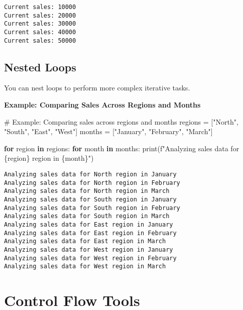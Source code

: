 \documentclass[
  letterpaper,
  DIV=11,
  numbers=noendperiod]{scrreprt}
\newenvironment{Shaded}{\begin{snugshade}}{\end{snugshade}}
\newcommand{\BuiltInTok}[1]{\textcolor[rgb]{0.00,0.23,0.31}{#1}}
\newcommand{\CommentTok}[1]{\textcolor[rgb]{0.37,0.37,0.37}{#1}}
\newcommand{\ControlFlowTok}[1]{\textcolor[rgb]{0.00,0.23,0.31}{\textbf{#1}}}
\newcommand{\KeywordTok}[1]{\textcolor[rgb]{0.00,0.23,0.31}{\textbf{#1}}}
\newcommand{\NormalTok}[1]{\textcolor[rgb]{0.00,0.23,0.31}{#1}}
\newcommand{\OperatorTok}[1]{\textcolor[rgb]{0.37,0.37,0.37}{#1}}
\newcommand{\SpecialCharTok}[1]{\textcolor[rgb]{0.37,0.37,0.37}{#1}}
\newcommand{\SpecialStringTok}[1]{\textcolor[rgb]{0.13,0.47,0.30}{#1}}
\newcommand{\StringTok}[1]{\textcolor[rgb]{0.13,0.47,0.30}{#1}}
\begin{document}
\begin{verbatim}
Current sales: 10000
Current sales: 20000
Current sales: 30000
Current sales: 40000
Current sales: 50000
\end{verbatim}

\subsection{Nested Loops}\label{nested-loops}

You can nest loops to perform more complex iterative tasks.

\textbf{Example: Comparing Sales Across Regions and Months}

\begin{Shaded}
\begin{Highlighting}[]
\CommentTok{\# Example: Comparing sales across regions and months}
\NormalTok{regions }\OperatorTok{=}\NormalTok{ [}\StringTok{"North"}\NormalTok{, }\StringTok{"South"}\NormalTok{, }\StringTok{"East"}\NormalTok{, }\StringTok{"West"}\NormalTok{]}
\NormalTok{months }\OperatorTok{=}\NormalTok{ [}\StringTok{"January"}\NormalTok{, }\StringTok{"February"}\NormalTok{, }\StringTok{"March"}\NormalTok{]}

\ControlFlowTok{for}\NormalTok{ region }\KeywordTok{in}\NormalTok{ regions:}
    \ControlFlowTok{for}\NormalTok{ month }\KeywordTok{in}\NormalTok{ months:}
        \BuiltInTok{print}\NormalTok{(}\SpecialStringTok{f"Analyzing sales data for }\SpecialCharTok{\{}\NormalTok{region}\SpecialCharTok{\}}\SpecialStringTok{ region in }\SpecialCharTok{\{}\NormalTok{month}\SpecialCharTok{\}}\SpecialStringTok{"}\NormalTok{)}
\end{Highlighting}
\end{Shaded}

\begin{verbatim}
Analyzing sales data for North region in January
Analyzing sales data for North region in February
Analyzing sales data for North region in March
Analyzing sales data for South region in January
Analyzing sales data for South region in February
Analyzing sales data for South region in March
Analyzing sales data for East region in January
Analyzing sales data for East region in February
Analyzing sales data for East region in March
Analyzing sales data for West region in January
Analyzing sales data for West region in February
Analyzing sales data for West region in March
\end{verbatim}

\section{Control Flow Tools}\label{control-flow-tools}
\end{document}
